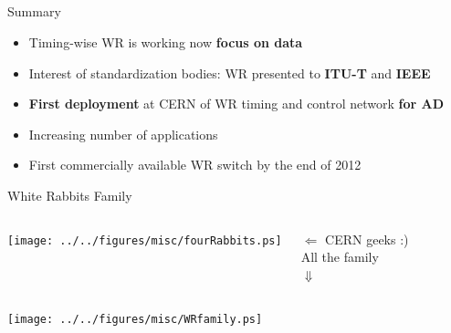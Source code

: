 \documentclass[compress,red]{beamer}
\begin{document}
\subsection{}
\begin{frame}{Summary}


    \begin{itemize}
      \item Timing-wise WR is working now \textbf{focus on data}
      \item Interest of standardization bodies: WR presented to \textbf{ITU-T} and \textbf{IEEE}
      \item \textbf{First deployment} at CERN of WR timing and control network \textbf{for AD}
      \item Increasing number of applications
      \item First commercially available WR switch by the end of 2012

    \end{itemize}    

 
\end{frame}
\begin{frame}{White Rabbits Family}
\begin{columns}[c]
\column{2.0in}
    \begin{center}
    \texttt{[image: ../../figures/misc/fourRabbits.ps]}
    \end{center}
\column{2.0in}
    \begin{center}
    $\Leftarrow$ CERN geeks :) \\
    All the family \\
    $\Downarrow$
     \end{center}
\end{columns}

\begin{center}
\texttt{[image: ../../figures/misc/WRfamily.ps]}
\end{center}
\end{frame}
\end{document}
